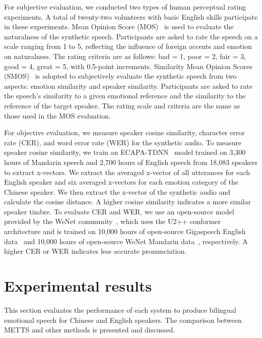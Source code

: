 \documentclass[journal,comsoc]{IEEEtran}
\begin{document}
For subjective evaluation, we conducted two types of human perceptual rating experiments.  A total of twenty-two volunteers with basic English skills participate in these experiments. Mean Opinion Score (MOS)~\cite{shang2021incorporating} is used to evaluate the naturalness of the synthetic speech. Participants are asked to rate the speech on a scale ranging from 1 to 5, reflecting the influence of foreign accents and emotion on naturalness. The rating criteria are as follows: bad = 1, poor = 2, fair = 3, good = 4, great = 5, with 0.5-point increments. Similarity Mean Opinion Scores (SMOS)~\cite{Li2021ControllableCE} is adopted to subjectively evaluate the synthetic speech from two aspects: emotion similarity and speaker similarity. Participants are asked to rate the speech's similarity to a given emotional reference and the similarity to the reference of the target speaker. The rating scale and criteria are the same as those used in the MOS evaluation.

For objective evaluation, we measure speaker cosine similarity, character error rate (CER), and word error rate (WER) for the synthetic audio. To measure speaker cosine similarity, we train an ECAPA-TDNN~\cite{DBLP:conf/interspeech/DesplanquesTD20} model trained on 3,300 hours of Mandarin speech and 2,700 hours of English speech from 18,083 speakers to extract x-vectors. We extract the averaged x-vector of all utterances for each English speaker and six averaged x-vectors for each emotion category of the Chinese speaker. We then extract the x-vector of the synthetic audio and calculate the cosine distance. A higher cosine similarity indicates a more similar speaker timbre. To evaluate CER and WER, we use an open-source model provided by the WeNet community~\cite{DBLP:conf/interspeech/YaoWWZYYPCXL21}, which uses the U2++ conformer architecture and is trained on 10,000 hours of open-source Gigaspeech English data~\cite{DBLP:conf/interspeech/ChenCWDZWSPTZJK21} and 10,000 hours of open-source WeNet Mandarin data~\cite{DBLP:conf/icassp/ZhangLGSYXXBCZW22}, respectively. A higher CER or WER indicates less accurate pronunciation.

\section{Experimental results}
\label{sc:results}

This section evaluates the performance of each system to produce bilingual emotional speech for Chinese and English speakers. The comparison between METTS and other methods is presented and discussed.
\end{document}
